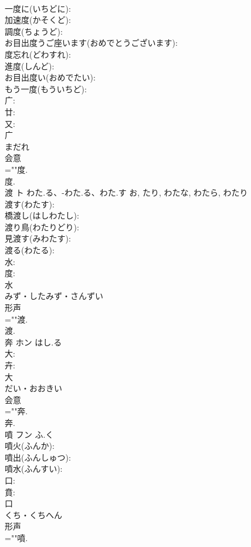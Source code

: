 \documentclass[8pt]{extreport}
\begin{document}
\begin{CJK}{UTF8}{min}
\\	一度に(いちどに): 
\\	加速度(かそくど): 
\\	調度(ちょうど): 
\\	お目出度うご座います(おめでとうございます): 
\\	度忘れ(どわすれ): 
\\	進度(しんど): 
\\	お目出度い(おめでたい): 
\\	もう一度(もういちど): 
\\	广: 
\\	廿: 
\\	又: 
\\	广	
\\	まだれ	
\\	会意 
\\	=""度.
\\	度.
\\	渡	ト	わた.る、-わた.る、わた.す	お, たり, わたな, わたら, わたり	
\\	渡す(わたす): 
\\	橋渡し(はしわたし): 
\\	渡り鳥(わたりどり): 
\\	見渡す(みわたす): 
\\	渡る(わたる): 
\\	水: 
\\	度: 
\\	水	
\\	みず・したみず・さんずい	
\\	形声 
\\	=""渡.
\\	渡.
\\	奔	ホン	はし.る		
\\	大: 
\\	卉: 
\\	大	
\\	だい・おおきい	
\\	会意 
\\	=""奔.
\\	奔.
\\	噴	フン	ふ.く		
\\	噴火(ふんか): 
\\	噴出(ふんしゅつ): 
\\	噴水(ふんすい): 
\\	口: 
\\	賁: 
\\	口	
\\	くち・くちへん	
\\	形声 
\\	=""噴.

\end{CJK}
\end{document}
